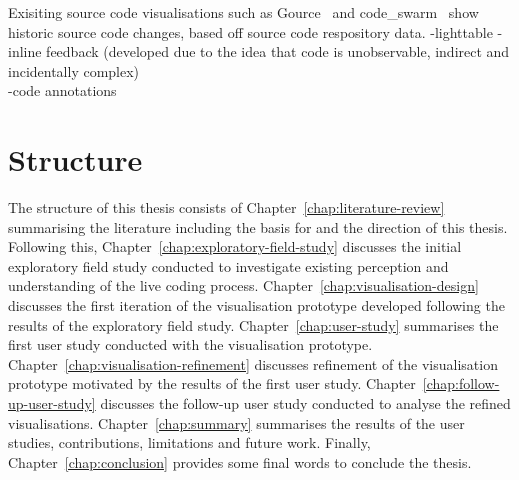 


Exisiting source code visualisations such as Gource~\cite{Caudwell2010} and code_swarm~\cite{Ogawa2012} show historic source code changes, based off source code respository data. 
-lighttable - inline feedback (developed due to the idea that code is unobservable, indirect and incidentally complex) \\
-code annotations~\cite{Swift2013}



\section{Structure}

The structure of this thesis consists of Chapter~\ref{chap:literature-review} summarising the literature including the basis for and the direction of this thesis. Following this, Chapter~\ref{chap:exploratory-field-study} discusses the initial exploratory field study conducted to investigate existing perception and understanding of the live coding process. Chapter~\ref{chap:visualisation-design} discusses the first iteration of the visualisation prototype developed following the results of the exploratory field study. Chapter~\ref{chap:user-study} summarises the first user study conducted with the visualisation prototype. Chapter~\ref{chap:visualisation-refinement} discusses refinement of the visualisation prototype motivated by the results of the first user study. Chapter~\ref{chap:follow-up-user-study} discusses the follow-up user study conducted to analyse the refined visualisations. Chapter~\ref{chap:summary} summarises the results of the user studies, contributions, limitations and future work. Finally, Chapter~\ref{chap:conclusion} provides some final words to conclude the thesis.


